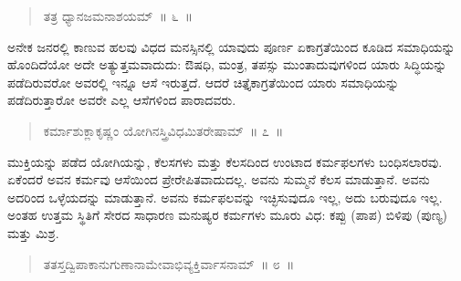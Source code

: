 \vspace{-0.1cm}

\begin{verse}
ತತ್ರ ಧ್ಯಾನಜಮನಾಶಯಮ್​~॥ ೬~॥
\end{verse}

\vspace{-0.45cm}


\vspace{0.2cm}

ಅನೇಕ ಜನರಲ್ಲಿ ಕಾಣುವ ಹಲವು ವಿಧದ ಮನಸ್ಸಿನಲ್ಲಿ ಯಾವುದು ಪೂರ್ಣ ಏಕಾಗ್ರತೆಯಿಂದ ಕೂಡಿದ ಸಮಾಧಿಯನ್ನು ಹೊಂದಿದೆಯೋ ಅದೇ ಅತ್ಯುತ್ತಮವಾದುದು: ಔಷಧಿ, ಮಂತ್ರ, ತಪಸ್ಸು ಮುಂತಾದುವುಗಳಿಂದ ಯಾರು ಸಿದ್ಧಿಯನ್ನು ಪಡೆದಿರುವರೋ ಅವರಲ್ಲಿ ಇನ್ನೂ ಆಸೆ ಇರುತ್ತದೆ. ಆದರೆ ಚಿತ್ತೈಕಾಗ್ರತೆಯಿಂದ ಯಾರು ಸಮಾಧಿಯನ್ನು ಪಡೆದಿರುತ್ತಾರೋ ಅವರೇ ಎಲ್ಲ ಆಸೆಗಳಿಂದ ಪಾರಾದವರು. 

\vspace{-0.1cm}

\begin{verse}
ಕರ್ಮಾಶುಕ್ಲಾಕೃಷ್ಣಂ ಯೋಗಿನಸ್ತ್ರಿವಿಧಮಿತರೇಷಾಮ್​~॥ ೭~॥
\end{verse}

\vspace{-0.35cm}


\newpage 

ಮುಕ್ತಿಯನ್ನು ಪಡೆದ ಯೋಗಿಯನ್ನು, ಕೆಲಸಗಳು ಮತ್ತು ಕೆಲಸದಿಂದ ಉಂಟಾದ ಕರ್ಮಫಲಗಳು ಬಂಧಿಸಲಾರವು. ಏಕೆಂದರೆ ಅವನ ಕರ್ಮವು ಆಸೆಯಿಂದ ಪ್ರೇರೇಪಿತವಾದುದಲ್ಲ. ಅವನು ಸುಮ್ಮನೆ ಕೆಲಸ ಮಾಡುತ್ತಾನೆ. ಅವನು ಅದರಿಂದ ಒಳ್ಳೆಯದನ್ನು ಮಾಡುತ್ತಾನೆ. ಅವನು ಕರ್ಮಫಲವನ್ನು ಇಚ್ಛಿಸುವುದೂ ಇಲ್ಲ, ಅದು ಬರುವುದೂ ಇಲ್ಲ. ಅಂತಹ ಉತ್ತಮ ಸ್ಥಿತಿಗೆ ಸೇರದ ಸಾಧಾರಣ ಮನುಷ್ಯರ ಕರ್ಮಗಳು ಮೂರು ವಿಧ: ಕಪ್ಪು (ಪಾಪ) ಬಿಳಿಪು (ಪುಣ್ಯ) ಮತ್ತು ಮಿಶ್ರ. 

\vspace{-0.2cm}

\begin{verse}
ತತಸ್ತದ್ವಿಪಾಕಾನುಗುಣಾನಾಮೇವಾಭಿವ್ಯಕ್ತಿರ್ವಾಸನಾಮ್​~॥ ೮~॥
\end{verse}

\vspace{-0.35cm}


\vspace{0.1cm}

